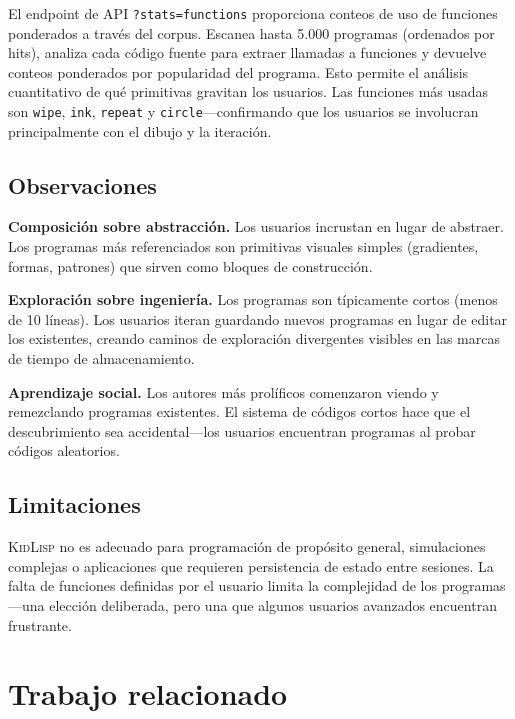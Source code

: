 \documentclass[10pt,letterpaper,twocolumn]{article}
\newcommand{\kidlisp}{\textsc{KidLisp}}
\begin{document}
El endpoint de API \texttt{?stats=functions} proporciona conteos de uso de funciones ponderados a través del corpus. Escanea hasta 5.000 programas (ordenados por hits), analiza cada código fuente para extraer llamadas a funciones y devuelve conteos ponderados por popularidad del programa. Esto permite el análisis cuantitativo de qué primitivas gravitan los usuarios. Las funciones más usadas son \texttt{wipe}, \texttt{ink}, \texttt{repeat} y \texttt{circle}---confirmando que los usuarios se involucran principalmente con el dibujo y la iteración.

\subsection{Observaciones}

\textbf{Composición sobre abstracción.} Los usuarios incrustan en lugar de abstraer. Los programas más referenciados son primitivas visuales simples (gradientes, formas, patrones) que sirven como bloques de construcción.

\textbf{Exploración sobre ingeniería.} Los programas son típicamente cortos (menos de 10 líneas). Los usuarios iteran guardando nuevos programas en lugar de editar los existentes, creando caminos de exploración divergentes visibles en las marcas de tiempo de almacenamiento.

\textbf{Aprendizaje social.} Los autores más prolíficos comenzaron viendo y remezclando programas existentes. El sistema de códigos cortos hace que el descubrimiento sea accidental---los usuarios encuentran programas al probar códigos aleatorios.

\subsection{Limitaciones}

\kidlisp{} no es adecuado para programación de propósito general, simulaciones complejas o aplicaciones que requieren persistencia de estado entre sesiones. La falta de funciones definidas por el usuario limita la complejidad de los programas---una elección deliberada, pero una que algunos usuarios avanzados encuentran frustrante.


\section{Trabajo relacionado}
\end{document}
